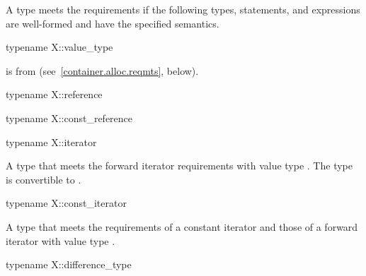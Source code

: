 \pnum
A type  meets the  requirements
if the following types, statements, and expressions are well-formed and
have the specified semantics.

%
\begin{itemdecl}
typename X::value_type
\end{itemdecl}

\begin{itemdescr}
\pnum
\result
{}

\pnum
\expects
{} is  from 
(see~\ref{container.alloc.reqmts}, below).
\end{itemdescr}

%
\begin{itemdecl}
typename X::reference
\end{itemdecl}

\begin{itemdescr}
\pnum
\result
{}
\end{itemdescr}

%
\begin{itemdecl}
typename X::const_reference
\end{itemdecl}

\begin{itemdescr}
\pnum
\result
{}
\end{itemdescr}

%
\begin{itemdecl}
typename X::iterator
\end{itemdecl}

\begin{itemdescr}
\pnum
\result
A type that meets the forward iterator requirements
with value type .
The type  is convertible to .
\end{itemdescr}

%
\begin{itemdecl}
typename X::const_iterator
\end{itemdecl}

\begin{itemdescr}
\pnum
\result
A type that meets the requirements of a constant iterator and
those of a forward iterator with value type .
\end{itemdescr}

%
\begin{itemdecl}
typename X::difference_type
\end{itemdecl}

